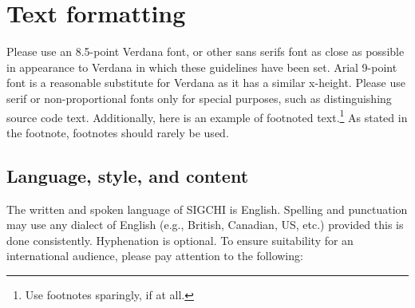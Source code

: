 \documentclass{ubicomp-ext}
\begin{document}
\section{Text formatting}
Please use an 8.5-point Verdana font, or other sans serifs font as close as possible in appearance to Verdana in which these guidelines have been set. 
Arial 9-point font is a reasonable substitute for Verdana as it has a similar x-height. 
Please use serif or non-proportional fonts only for special purposes, such as distinguishing source code text.
Additionally, here is an example of footnoted text.\footnote{Use footnotes sparingly, if at all.}
As stated in the footnote, footnotes should rarely be used.

\subsection{Language, style, and content}
The written and spoken language of SIGCHI is English. 
Spelling and punctuation may use any dialect of English (e.g., British, Canadian, US, etc.) provided this is done consistently. 
Hyphenation is optional. 
To ensure suitability for an international audience, please pay attention to the following:
\end{document}
